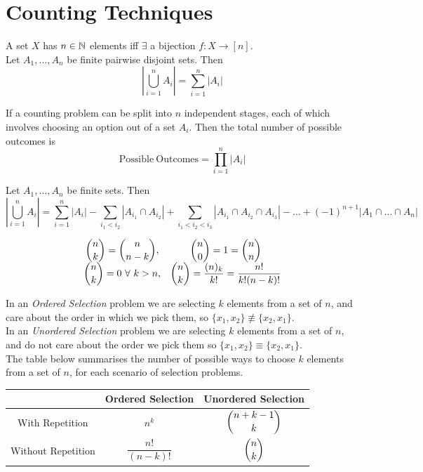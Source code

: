 \documentclass[11pt,a4paper]{article}
\begin{document}
\section{Counting Techniques}

A set $X$ has $n\in\mathbb{N}$ elements iff $\exists$ a bijection $f:X\to[n]$.\\

Let $A_1,\dots,A_n$ be finite pairwise disjoint sets. Then
$$\left|\bigcup_{i=1}^nA_i\right|=\sum_{i=1}^n|A_i|$$

If a counting problem can be split into $n$ independent stages, each of which involves choosing an option out of a set $A_i$. Then the total number of possible outcomes is
$$\mathrm{Possible\ Outcomes}=\prod_{i=1}^n|A_i|$$

Let $A_1,\dots,A_n$ be finite sets. Then
$$\left|\bigcup_{i=1}^nA_i\right|=\sum_{i=1}^n|A_i|-\sum_{i_1<i_2}|A_{i_1}\cap A_{i_2}|+\sum_{i_1<i_2<i_3}|A_{i_1}\cap A_{i_2}\cap A_{i_3}|-\dots+(-1)^{n+1}|A_1\cap\dots\cap A_n|$$

\[\begin{array}{cc}
\Binomial{n}{k}=\Binomial{n}{n-k},&\Binomial{n}{0}=1=\Binomial{n}{n}\\
\Binomial{n}{k}=0\ \forall\ k>n,&\Binomial{n}{k}=\dfrac{(n)_k}{k!}=\dfrac{n!}{k!(n-k)!}
\end{array}\]

In an \textit{Ordered Selection} problem we are selecting $k$ elements from a set of $n$, and care about the order in which we pick them, so $\{x_1,x_2\}\not\equiv\{x_2,x_1\}$.\\

In an \textit{Unordered Selection} problem we are selecting $k$ elements from a set of $n$, and do not care about the order we pick them so $\{x_1,x_2\}\equiv\{x_2,x_1\}$.\\

The table below summarises the number of possible ways to choose $k$ elements from a set of $n$, for each scenario of selection problems.\\
\begin{tabular}{|c|c|c|}
\hline
&Ordered Selection&Unordered Selection\\
\hline
With Repetition&$n^k$&$\displaystyle{{{n+k-1}\choose{k}}}$\\
\hline
Without Repetition&$\dfrac{n!}{(n-k)!}$&$\displaystyle{{{n}\choose{k}}}$\\
\hline
\end{tabular}\\
\end{document}
